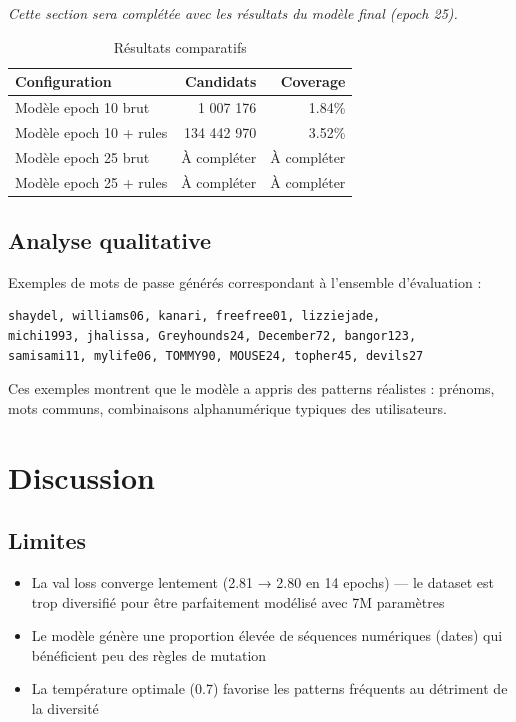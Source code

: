 \documentclass[12pt,a4paper]{article}
\begin{document}
\textit{Cette section sera complétée avec les résultats du modèle final (epoch 25).}

\begin{table}[H]
\centering
\begin{tabular}{lrr}
\toprule
\textbf{Configuration} & \textbf{Candidats} & \textbf{Coverage} \\
\midrule
Modèle epoch 10 brut & 1 007 176 & 1.84\% \\
Modèle epoch 10 + rules & 134 442 970 & 3.52\% \\
Modèle epoch 25 brut & À compléter & À compléter \\
Modèle epoch 25 + rules & À compléter & À compléter \\
\bottomrule
\end{tabular}
\caption{Résultats comparatifs}
\end{table}

\subsection{Analyse qualitative}

Exemples de mots de passe générés correspondant à l'ensemble d'évaluation :

\begin{lstlisting}
shaydel, williams06, kanari, freefree01, lizziejade,
michi1993, jhalissa, Greyhounds24, December72, bangor123,
samisami11, mylife06, TOMMY90, MOUSE24, topher45, devils27
\end{lstlisting}

Ces exemples montrent que le modèle a appris des patterns réalistes : prénoms, mots communs, combinaisons alphanumérique typiques des utilisateurs.

\section{Discussion}

\subsection{Limites}

\begin{itemize}
    \item La val loss converge lentement (2.81 → 2.80 en 14 epochs) — le dataset est trop diversifié pour être parfaitement modélisé avec 7M paramètres
    \item Le modèle génère une proportion élevée de séquences numériques (dates) qui bénéficient peu des règles de mutation
    \item La température optimale (0.7) favorise les patterns fréquents au détriment de la diversité
\end{itemize}
\end{document}
